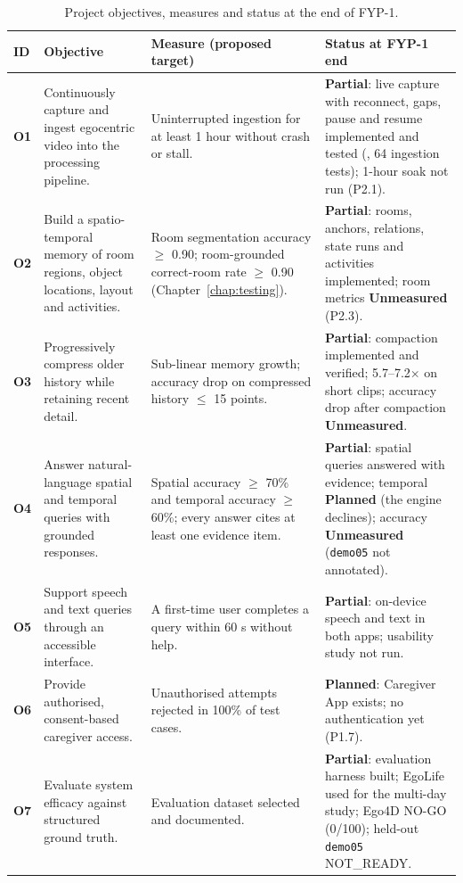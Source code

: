 \begin{table}[H]
\centering\footnotesize
\caption{Project objectives, measures and status at the end of FYP-1.}
\label{tab:objectives}
\begin{tabularx}{\textwidth}{@{}>{\bfseries}l L{3.2cm} Y Y@{}}
\toprule
{}\textbf{ID} & \textbf{Objective} & \textbf{Measure (proposed target)} & \textbf{Status at FYP-1 end}\\
\midrule
O1 & Continuously capture and ingest egocentric video into the processing pipeline. & Uninterrupted ingestion for at least 1 hour without crash or stall. & \textbf{Partial}: live capture with reconnect, gaps, pause and resume implemented and tested (, 64 ingestion tests); 1-hour soak not run (P2.1).\\
O2 & Build a spatio-temporal memory of room regions, object locations, layout and activities. & Room segmentation accuracy $\geq$ 0.90; room-grounded correct-room rate $\geq$ 0.90 (Chapter~\ref{chap:testing}). & \textbf{Partial}: rooms, anchors, relations, state runs and activities implemented; room metrics \textbf{Unmeasured} (P2.3).\\
O3 & Progressively compress older history while retaining recent detail. & Sub-linear memory growth; accuracy drop on compressed history $\leq$ 15 points. & \textbf{Partial}: compaction implemented and verified; 5.7--7.2$\times$ on short clips; accuracy drop after compaction \textbf{Unmeasured}.\\
O4 & Answer natural-language spatial and temporal queries with grounded responses. & Spatial accuracy $\geq$ 70\% and temporal accuracy $\geq$ 60\%; every answer cites at least one evidence item. & \textbf{Partial}: spatial queries answered with evidence; temporal \textbf{Planned} (the engine declines); accuracy \textbf{Unmeasured} (\texttt{demo05} not annotated).\\
O5 & Support speech and text queries through an accessible interface. & A first-time user completes a query within 60 s without help. & \textbf{Partial}: on-device speech and text in both apps; usability study not run.\\
O6 & Provide authorised, consent-based caregiver access. & Unauthorised attempts rejected in 100\% of test cases. & \textbf{Planned}: Caregiver App exists; no authentication yet (P1.7).\\
O7 & Evaluate system efficacy against structured ground truth. & Evaluation dataset selected and documented. & \textbf{Partial}: evaluation harness built; EgoLife used for the multi-day study; Ego4D NO-GO (0/100); held-out \texttt{demo05} NOT\_READY.\\
\bottomrule
\end{tabularx}
\end{table}


